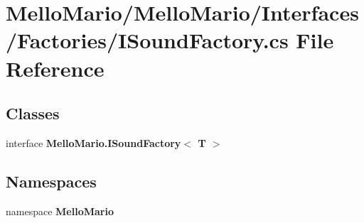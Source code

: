 \section{Mello\+Mario/\+Mello\+Mario/\+Interfaces/\+Factories/\+I\+Sound\+Factory.cs File Reference}
\label{ISoundFactory_8cs}
\subsection*{Classes}
\begin{DoxyCompactItemize}
\item 
interface \textbf{ Mello\+Mario.\+I\+Sound\+Factory$<$ T $>$}
\end{DoxyCompactItemize}
\subsection*{Namespaces}
\begin{DoxyCompactItemize}
\item 
namespace \textbf{ Mello\+Mario}
\end{DoxyCompactItemize}
